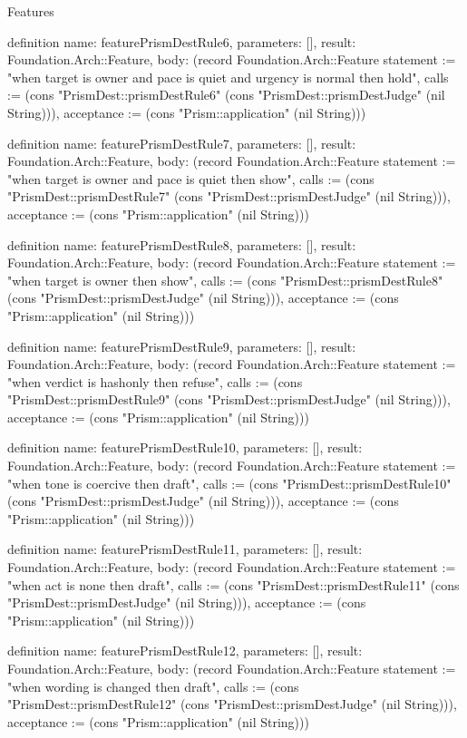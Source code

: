 \begin{lexlean}{Features}
\begin{semanticmodule}
definition{
  name: featurePrismDestRule6,
  parameters: [],
  result: Foundation.Arch::Feature,
  body: (record Foundation.Arch::Feature {statement := "when target is owner and pace is quiet and urgency is normal then hold", calls := (cons "PrismDest::prismDestRule6" (cons "PrismDest::prismDestJudge" (nil String))), acceptance := (cons "Prism::application" (nil String))})
}

definition{
  name: featurePrismDestRule7,
  parameters: [],
  result: Foundation.Arch::Feature,
  body: (record Foundation.Arch::Feature {statement := "when target is owner and pace is quiet then show", calls := (cons "PrismDest::prismDestRule7" (cons "PrismDest::prismDestJudge" (nil String))), acceptance := (cons "Prism::application" (nil String))})
}

definition{
  name: featurePrismDestRule8,
  parameters: [],
  result: Foundation.Arch::Feature,
  body: (record Foundation.Arch::Feature {statement := "when target is owner then show", calls := (cons "PrismDest::prismDestRule8" (cons "PrismDest::prismDestJudge" (nil String))), acceptance := (cons "Prism::application" (nil String))})
}

definition{
  name: featurePrismDestRule9,
  parameters: [],
  result: Foundation.Arch::Feature,
  body: (record Foundation.Arch::Feature {statement := "when verdict is hashonly then refuse", calls := (cons "PrismDest::prismDestRule9" (cons "PrismDest::prismDestJudge" (nil String))), acceptance := (cons "Prism::application" (nil String))})
}

definition{
  name: featurePrismDestRule10,
  parameters: [],
  result: Foundation.Arch::Feature,
  body: (record Foundation.Arch::Feature {statement := "when tone is coercive then draft", calls := (cons "PrismDest::prismDestRule10" (cons "PrismDest::prismDestJudge" (nil String))), acceptance := (cons "Prism::application" (nil String))})
}

definition{
  name: featurePrismDestRule11,
  parameters: [],
  result: Foundation.Arch::Feature,
  body: (record Foundation.Arch::Feature {statement := "when act is none then draft", calls := (cons "PrismDest::prismDestRule11" (cons "PrismDest::prismDestJudge" (nil String))), acceptance := (cons "Prism::application" (nil String))})
}

definition{
  name: featurePrismDestRule12,
  parameters: [],
  result: Foundation.Arch::Feature,
  body: (record Foundation.Arch::Feature {statement := "when wording is changed then draft", calls := (cons "PrismDest::prismDestRule12" (cons "PrismDest::prismDestJudge" (nil String))), acceptance := (cons "Prism::application" (nil String))})
}


\end{semanticmodule}
\end{lexlean}
